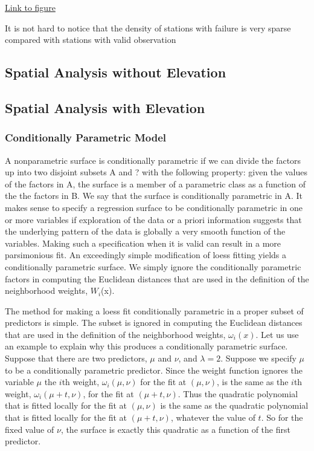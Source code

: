 \begin{framed}
\begin{center}
  \href{../plots/tmax.a1950.status.pdf}
  {Link to figure}
  \label{a1950.status}
\end{center}
\end{framed}

It is not hard to notice that the density of stations with failure is very sparse
compared with stations with valid observation 


\subsection{Spatial Analysis without Elevation}

\subsection{Spatial Analysis with Elevation}



\subsubsection{Conditionally Parametric Model}

A nonparametric surface is conditionally
parametric if we can divide the factors up into two disjoint subsets
A and ? with the following property: given the values of the factors in A,
the surface is a member of a parametric class as a function of the the factors
in B. We say that the surface is conditionally parametric in A.
It makes sense to specify a regression surface to be conditionally parametric
in one or more variables if exploration of the data or a priori information
suggests that the underlying pattern of the data is globally a very smooth
function of the variables. Making such a specification when it is valid can
result in a more parsimonious fit.
An exceedingly simple modification of loess fitting yields a conditionally
parametric surface. We simply ignore the conditionally parametric factors
in computing the Euclidean distances that are used in the definition of the
neighborhood weights, $W_i$(x).

The method for making a loess fit conditionally parametric in a proper subset of
predictors is simple. The subset is ignored in computing the Euclidean distances 
that are used in the definition of the neighborhood weights, $\omega_i(x)$. Let 
us use an example to explain why this produces a conditionally parametric surface. 
Suppose that there are two predictors, $\mu$ and $\nu$, and $\lambda=2$. Suppose 
we specify $\mu$ to be a conditionally parametric predictor. Since the weight 
function ignores the variable $\mu$ the $i$th weight, $\omega_i(\mu, \nu)$ for 
the fit at $(\mu, \nu)$, is the same as the $i$th weight, $\omega_i(\mu+t, \nu)$, 
for the fit at $(\mu+t, \nu)$. Thus the quadratic polynomial that is fitted locally 
for the fit at $(\mu, \nu)$ is the same as the quadratic polynomial that is fitted 
locally for the fit at $(\mu+t, \nu)$, whatever the value of $t$. So for the fixed 
value of $\nu$, the surface is exactly this quadratic as a function of the first 
predictor.

